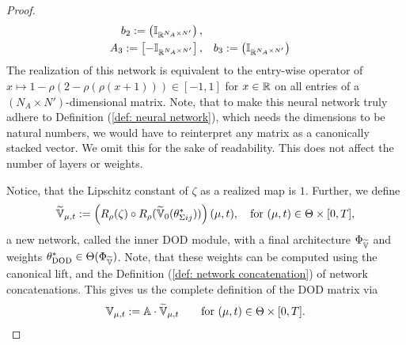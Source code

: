 \begin{proof}
\begin{align*}
        \quad
        b_2 := \begin{pmatrix}
            \mathbb{I}_{\mathbb{R}^{N_A \times N'}}
        \end{pmatrix}, \\
        A_3 := \begin{bmatrix}
            -\mathbb{I}_{\mathbb{R}^{N_A \times N'}}
        \end{bmatrix},&
        \quad
        b_3 := \begin{pmatrix}
            \mathbb{I}_{\mathbb{R}^{N_A \times N'}}
        \end{pmatrix}
    \end{align*}
    The realization of this network is equivalent to the entry-wise operator of $x \mapsto 1 - \rho(2 - \rho(\rho(x + 1))) 
    \in [-1, 1]$
    for $x \in \mathbb{R}$ on all entries of 
    a $(N_A \times N')$-dimensional matrix. Note, that to make this neural network truly adhere to Definition
    (\ref{def: neural network}), which needs the
    dimensions to be natural numbers, we would have to reinterpret any matrix as a canonically stacked vector. 
    We omit this for the sake of readability. This does not affect the number of layers or weights.

    Notice, that the Lipschitz constant of $\zeta$ as a realized map is $1$.
    Further, we define
    \begin{equation*}
        \widetilde{\mathbb{V}}_{\mu, t} := \left(R_\rho(\zeta) \circ R_\rho(\widetilde{\mathbb{V}}_0(\theta^*_{\Sigma ij})) \right)
        (\mu, t), \quad \text{for } (\mu, t) \in \Theta \times [0, T],
    \end{equation*}
    a new network, called the inner DOD module, with a final
    architecture $\Phi_{\widetilde{\mathbb{V}}}$ and weights $\theta^*_\text{DOD} 
    \in \Theta(\Phi_{\widetilde{\mathbb{V}}})$. Note, that these weights can be computed using the canonical lift, and 
    the Definition (\ref{def: network concatenation}) of network concatenations. 
    This gives us the complete definition of the DOD matrix via
    \begin{equation*}
        \mathbb{V}_{\mu, t} := \mathbb{A} \cdot \widetilde{\mathbb{V}}_{\mu, t} \qquad \text{for } (\mu, t) \in \Theta \times [0, T].
    \end{equation*}
    

\end{proof}
